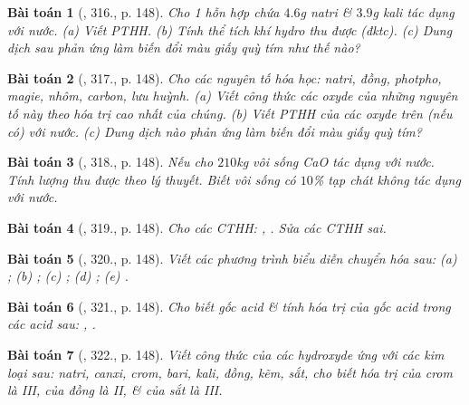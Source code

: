 \documentclass{article}
\newtheorem{baitoan}{Bài toán}
\begin{document}
\begin{baitoan}[\cite{An_400_BT_Hoa_Hoc_8_2020}, 316., p. 148]
	Cho 1 hỗn hợp chứa $4.6$\emph{g} natri \& $3.9$\emph{g} kali tác dụng với nước. (a) Viết PTHH. (b) Tính thể tích khí hydro thu được (đktc). (c) Dung dịch sau phản ứng làm biến đổi màu giấy quỳ tím như thế nào?
\end{baitoan}

\begin{baitoan}[\cite{An_400_BT_Hoa_Hoc_8_2020}, 317., p. 148]
	Cho các nguyên tố hóa học: natri, đồng, photpho, magie, nhôm, carbon, lưu huỳnh. (a) Viết công thức các oxyde của những nguyên tố này theo hóa trị cao nhất của chúng. (b) Viết PTHH của các oxyde trên (nếu có) với nước. (c) Dung dịch nào phản ứng làm biến đổi màu giấy quỳ tím?
\end{baitoan}

\begin{baitoan}[\cite{An_400_BT_Hoa_Hoc_8_2020}, 318., p. 148]
	Nếu cho $210$\emph{kg} vôi sống \emph{CaO} tác dụng với nước. Tính lượng \emph{} thu được theo lý thuyết. Biết vôi sống có $10$\% tạp chát không tác dụng với nước.
\end{baitoan}

\begin{baitoan}[\cite{An_400_BT_Hoa_Hoc_8_2020}, 319., p. 148]
	Cho các CTHH: \emph{, }. Sửa các CTHH sai.
\end{baitoan}

\begin{baitoan}[\cite{An_400_BT_Hoa_Hoc_8_2020}, 320., p. 148]
	Viết các phương trình biểu diễn chuyển hóa sau: (a) \emph{}; (b) \emph{}; (c) \emph{}; (d) \emph{}; (e) \emph{}.
\end{baitoan}

\begin{baitoan}[\cite{An_400_BT_Hoa_Hoc_8_2020}, 321., p. 148]
	Cho biết gốc acid \& tính hóa trị của gốc acid trong các acid sau: \emph{, }.
\end{baitoan}

\begin{baitoan}[\cite{An_400_BT_Hoa_Hoc_8_2020}, 322., p. 148]
	Viết công thức của các hydroxyde ứng với các kim loại sau: natri, canxi, crom, bari, kali, đồng, kẽm, sắt, cho biết hóa trị của crom là III, của đồng là II, \& của sắt là III.
\end{baitoan}
\end{document}
